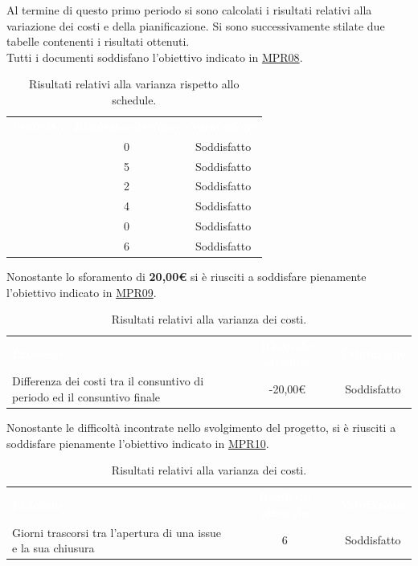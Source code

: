 Al termine di questo primo periodo si sono calcolati i risultati relativi alla variazione dei costi e della pianificazione. Si sono successivamente stilate due tabelle contenenti i risultati ottenuti.\\Tutti i documenti soddisfano l'obiettivo indicato in \hyperlink{MPR08}{MPR08}.
\begin{table} [H]
	\begin{center}
		\begin{tabular}{|C{6cm}|c|c|}
			\textcolor{white}{\textbf{Prodotto}}&
			\textcolor{white}{\textbf{Risultato ottenuto}}&
			\textcolor{white}{\textbf{Valutazione}}\\
			 & 0 & Soddisfatto\\ \hline
			 & 5 & Soddisfatto\\ \hline
			 & 2 & Soddisfatto\\ \hline
			 & 4 & Soddisfatto\\ \hline
			 & 0 & Soddisfatto\\ \hline
			 & 6 & Soddisfatto\\ \hline
		\end{tabular}
	\end{center}
	\caption{\label{tab:MPR08Analisi}Risultati relativi alla varianza rispetto allo schedule.}
\end{table}\noindent
Nonostante lo sforamento di \textbf{20,00€} si è riusciti a soddisfare pienamente l'obiettivo indicato in \hyperlink{MPR09}{MPR09}.
\begin{table} [H]
	\begin{center}
		\begin{tabular}{|C{6cm}|c|c|}
			\textcolor{white}{\textbf{Processo}}&
			\textcolor{white}{\textbf{Risultato ottenuto}}&
			\textcolor{white}{\textbf{Valutazione}}\\
			Differenza dei costi tra il consuntivo di periodo ed il consuntivo finale & -20,00€ & Soddisfatto\\ \hline
		\end{tabular}
	\end{center}
	\caption{\label{tab:MPR09Analisi}Risultati relativi alla varianza dei costi.}
\end{table}\noindent
Nonostante le difficoltà incontrate nello svolgimento del progetto, si è riusciti a soddisfare pienamente l'obiettivo indicato in \hyperlink{MPR10}{MPR10}.
\begin{table} [H]
	\begin{center}
		\begin{tabular}{|C{6cm}|c|c|}
			\textcolor{white}{\textbf{Processo}}&
			\textcolor{white}{\textbf{Risultato ottenuto}}&
			\textcolor{white}{\textbf{Valutazione}}\\
			Giorni trascorsi tra l'apertura di una issue e la sua chiusura & 6 & Soddisfatto\\ \hline
		\end{tabular}
	\end{center}
	\caption{\label{tab:MPR10Analisi}Risultati relativi alla varianza dei costi.}
\end{table}

